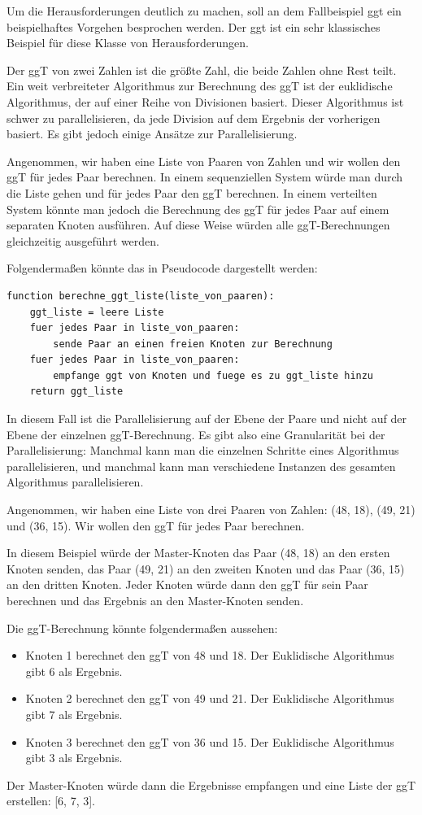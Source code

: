 Um die Herausforderungen deutlich zu machen, soll an dem Fallbeispiel ggt ein beispielhaftes Vorgehen besprochen werden. Der ggt ist ein sehr klassisches Beispiel für diese Klasse von Herausforderungen. 

Der ggT von zwei Zahlen ist die größte Zahl, die beide Zahlen ohne Rest teilt. Ein weit verbreiteter Algorithmus zur Berechnung des ggT ist der euklidische Algorithmus, der auf einer Reihe von Divisionen basiert. Dieser Algorithmus ist schwer zu parallelisieren, da jede Division auf dem Ergebnis der vorherigen basiert. Es gibt jedoch einige Ansätze zur Parallelisierung.

Angenommen, wir haben eine Liste von Paaren von Zahlen und wir wollen den ggT für jedes Paar berechnen. In einem sequenziellen System würde man durch die Liste gehen und für jedes Paar den ggT berechnen. In einem verteilten System könnte man jedoch die Berechnung des ggT für jedes Paar auf einem separaten Knoten ausführen. Auf diese Weise würden alle ggT-Berechnungen gleichzeitig ausgeführt werden.

Folgendermaßen könnte das in Pseudocode dargestellt werden:

\begin{lstlisting}[caption={ggT},captionpos=b,label={lst:ggt}]
function berechne_ggt_liste(liste_von_paaren):
    ggt_liste = leere Liste
    fuer jedes Paar in liste_von_paaren:
        sende Paar an einen freien Knoten zur Berechnung
    fuer jedes Paar in liste_von_paaren:
        empfange ggt von Knoten und fuege es zu ggt_liste hinzu
    return ggt_liste
\end{lstlisting}

In diesem Fall ist die Parallelisierung auf der Ebene der Paare und nicht auf der Ebene der einzelnen ggT-Berechnung. Es gibt also eine Granularität bei der Parallelisierung: Manchmal kann man die einzelnen Schritte eines Algorithmus parallelisieren, und manchmal kann man verschiedene Instanzen des gesamten Algorithmus parallelisieren.

Angenommen, wir haben eine Liste von drei Paaren von Zahlen: (48, 18), (49, 21) und (36, 15). Wir wollen den ggT für jedes Paar berechnen.

In diesem Beispiel würde der Master-Knoten das Paar (48, 18) an den ersten Knoten senden, das Paar (49, 21) an den zweiten Knoten und das Paar (36, 15) an den dritten Knoten. Jeder Knoten würde dann den ggT für sein Paar berechnen und das Ergebnis an den Master-Knoten senden.

Die ggT-Berechnung könnte folgendermaßen aussehen:
\begin{itemize}
\item Knoten 1 berechnet den ggT von 48 und 18. Der Euklidische Algorithmus gibt 6 als Ergebnis.
\item Knoten 2 berechnet den ggT von 49 und 21. Der Euklidische Algorithmus gibt 7 als Ergebnis.
\item Knoten 3 berechnet den ggT von 36 und 15. Der Euklidische Algorithmus gibt 3 als Ergebnis.
\end{itemize}
Der Master-Knoten würde dann die Ergebnisse empfangen und eine Liste der ggT erstellen: [6, 7, 3].

